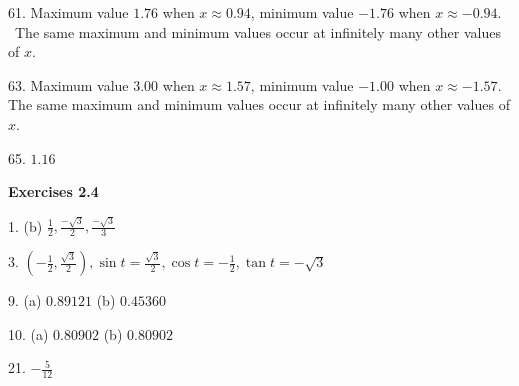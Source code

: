 61. Maximum value $1.76$ when $x \approx 0.94$, minimum value $ -1.76$ when $x \approx  -0.94\text{.}$ \ The same maximum and minimum values occur at infinitely many other values
of $x$. 

63. Maximum value $3.00$ when $x \approx 1.57\text{,}$ minimum value $ -1.00$ when $x \approx  -1.57$. The same maximum and minimum values occur at infinitely many other values of $x$. 

65. $1.16$ 

\textbf{Exercises 2.4} 
\begin{multicols}{2}

1. (b) $\frac{1}{2} ,\frac{ -\sqrt{3}}{2} ,\frac{ -\sqrt{3}}{3}$ 

3. $\left ( -\frac{1}{2} ,\frac{\sqrt{3}}{2}\right ) ,\sin  t =\frac{\sqrt{3}}{2} ,\cos  t = -\frac{1}{2} ,\tan  t = -\sqrt{3}$ 

9. (a) $0.89121$ (b) $0.45360$ 

10. (a) $0.80902$ (b) $0.80902$ 

21. $ -\frac{5}{12}$ 
\end{multicols}

